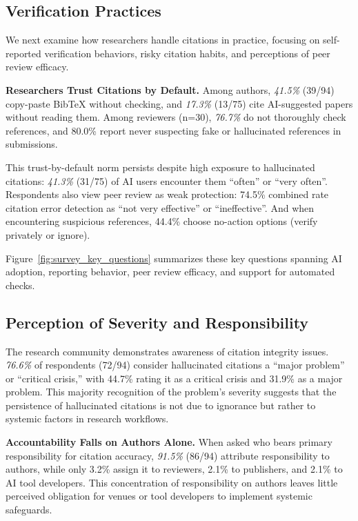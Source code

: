 \subsection{Verification Practices}

We next examine how researchers handle citations in practice, focusing on self-reported verification behaviors, risky citation habits, and perceptions of peer review efficacy.

\noindent
\textbf{Researchers Trust Citations by Default.}
Among authors, \textit{41.5\%} (39/94) copy-paste BibTeX without checking, and \textit{17.3\%} (13/75) cite AI-suggested papers without reading them. Among reviewers (n=30), \textit{76.7\%} do not thoroughly check references, and 80.0\% report never suspecting fake or hallucinated references in submissions.

This trust-by-default norm persists despite high exposure to hallucinated citations: \textit{41.3\%} (31/75) of AI users encounter them ``often'' or ``very often''. Respondents also view peer review as weak protection: 74.5\% combined rate citation error detection as ``not very effective'' or ``ineffective''. And when encountering suspicious references, 44.4\% choose no-action options (verify privately or ignore).

Figure~\ref{fig:survey_key_questions} summarizes these key questions spanning AI adoption, reporting behavior, peer review efficacy, and support for automated checks.



\subsection{Perception of Severity and Responsibility}

The research community demonstrates awareness of citation integrity issues.
\textit{76.6\%} of respondents (72/94) consider hallucinated citations a ``major problem'' or ``critical crisis,'' with 44.7\% rating it as a critical crisis and 31.9\% as a major problem.
This majority recognition of the problem's severity suggests that the persistence of hallucinated citations is not due to ignorance but rather to systemic factors in research workflows.

\noindent
\textbf{Accountability Falls on Authors Alone.}
When asked who bears primary responsibility for citation accuracy, \textit{91.5\%} (86/94) attribute responsibility to authors, while only 3.2\% assign it to reviewers, 2.1\% to publishers, and 2.1\% to AI tool developers.
This concentration of responsibility on authors leaves little perceived obligation for venues or tool developers to implement systemic safeguards.

